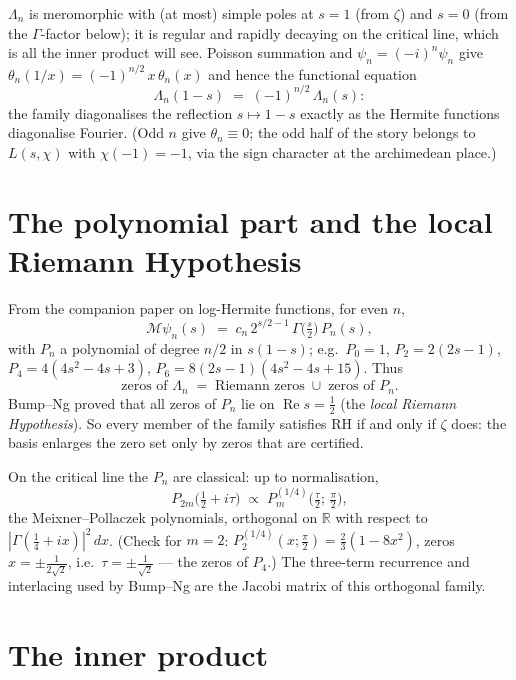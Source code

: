\documentclass[11pt]{article}
\theoremstyle{remark}
\newcommand{\R}{\mathbb{R}}
\newcommand{\M}{\mathcal{M}}
\begin{document}
$\Lambda_n$ is meromorphic with (at most) simple poles at $s = 1$ (from $\zeta$) and $s = 0$ (from the $\Gamma$-factor below); it is regular and rapidly decaying on the critical line, which is all the inner product will see. Poisson summation and $\widehat{\psi_n} = (-i)^n \psi_n$ give $\theta_n(1/x) = (-1)^{n/2}\, x\, \theta_n(x)$ and hence the functional equation
\[
\Lambda_n(1 - s) \;=\; (-1)^{n/2}\, \Lambda_n(s):
\]
the family diagonalises the reflection $s \mapsto 1-s$ exactly as the Hermite functions diagonalise Fourier. (Odd $n$ give $\theta_n \equiv 0$; the odd half of the story belongs to $L(s,\chi)$ with $\chi(-1) = -1$, via the sign character at the archimedean place.)

\section{The polynomial part and the local Riemann Hypothesis}

From the companion paper on log-Hermite functions, for even $n$,
\begin{equation}
\M\psi_n(s) \;=\; c_n\, 2^{s/2 - 1}\, \Gamma\!\bigl(\tfrac{s}{2}\bigr)\, P_n(s),
\label{eq:gammafactor}
\end{equation}
with $P_n$ a polynomial of degree $n/2$ in $s(1-s)$; e.g.\ $P_0 = 1$, $P_2 = 2(2s-1)$, $P_4 = 4(4s^2 - 4s + 3)$, $P_6 = 8(2s-1)(4s^2-4s+15)$. Thus
\[
\text{zeros of } \Lambda_n \;=\; \text{Riemann zeros} \;\cup\; \text{zeros of } P_n .
\]
Bump--Ng proved that all zeros of $P_n$ lie on $\operatorname{Re} s = \tfrac12$ (the \emph{local Riemann Hypothesis}). So every member of the family satisfies RH if and only if $\zeta$ does: the basis enlarges the zero set only by zeros that are certified.

On the critical line the $P_n$ are classical: up to normalisation,
\begin{equation}
P_{2m}\bigl(\tfrac12 + i\tau\bigr) \;\propto\; P^{(1/4)}_m\bigl(\tfrac{\tau}{2};\, \tfrac{\pi}{2}\bigr),
\label{eq:MP}
\end{equation}
the Meixner--Pollaczek polynomials, orthogonal on $\R$ with respect to $|\Gamma(\tfrac14 + ix)|^2\,dx$. (Check for $m = 2$: $P^{(1/4)}_2(x; \tfrac\pi2) = \tfrac{2}{3}(1 - 8x^2)$, zeros $x = \pm\tfrac{1}{2\sqrt2}$, i.e.\ $\tau = \pm\tfrac{1}{\sqrt2}$ --- the zeros of $P_4$.) The three-term recurrence and interlacing used by Bump--Ng are the Jacobi matrix of this orthogonal family.

\section{The inner product}
\end{document}
